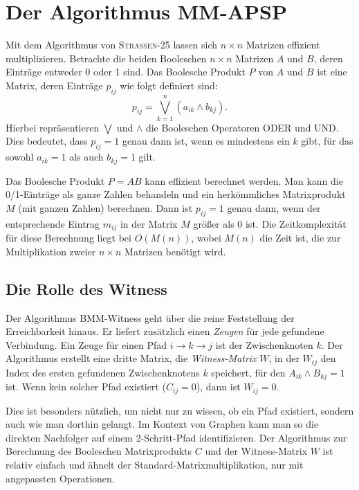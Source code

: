 \documentclass{scrartcl}
\numberwithin{equation}{section}
\begin{document}
\section{Der Algorithmus MM-APSP}
Mit dem Algorithmus von \textsc{Strassen-25} lassen sich $n \times n$ Matrizen effizient multiplizieren. Betrachte die beiden Booleschen $n \times n$ Matrizen $A$ und $B$, deren Einträge entweder 0 oder 1 sind. Das Boolesche Produkt $P$ von $A$ und $B$ ist eine Matrix, deren Einträge $p_{ij}$ wie folgt definiert sind:
$$p_{ij}=\bigvee_{k=1}^{n}(a_{ik}\wedge b_{kj}).$$
Hierbei repräsentieren $\bigvee$ und $\wedge$ die Booleschen Operatoren ODER und UND. Dies bedeutet, dass $p_{ij}=1$ genau dann ist, wenn es mindestens ein $k$ gibt, für das sowohl $a_{ik}=1$ als auch $b_{kj}=1$ gilt.

Das Boolesche Produkt $P=AB$ kann effizient berechnet werden. Man kann die 0/1-Einträge als ganze Zahlen behandeln und ein herkömmliches Matrixprodukt $M$ (mit ganzen Zahlen) berechnen. Dann ist $p_{ij}=1$ genau dann, wenn der entsprechende Eintrag $m_{ij}$ in der Matrix $M$ größer als 0 ist. Die Zeitkomplexität für diese Berechnung liegt bei $O(M(n))$, wobei $M(n)$ die Zeit ist, die zur Multiplikation zweier $n \times n$ Matrizen benötigt wird.

\subsection{Die Rolle des Witness}
Der Algorithmus BMM-Witness geht über die reine Feststellung der Erreichbarkeit hinaus. Er liefert zusätzlich einen \textit{Zeugen} für jede gefundene Verbindung. Ein Zeuge für einen Pfad $i \to k \to j$ ist der Zwischenknoten $k$. Der Algorithmus erstellt eine dritte Matrix, die \textit{Witness-Matrix} $W$, in der $W_{ij}$ den Index des ersten gefundenen Zwischenknotens $k$ speichert, für den $A_{ik} \land B_{kj} = 1$ ist. Wenn kein solcher Pfad existiert ($C_{ij} = 0$), dann ist $W_{ij} = 0$.

Dies ist besonders nützlich, um nicht nur zu wissen, ob ein Pfad existiert, sondern auch wie man dorthin gelangt. Im Kontext von Graphen kann man so die direkten Nachfolger auf einem 2-Schritt-Pfad identifizieren. Der Algorithmus zur Berechnung des Booleschen Matrixprodukts $C$ und der Witness-Matrix $W$ ist relativ einfach und ähnelt der Standard-Matrixmultiplikation, nur mit angepassten Operationen.
\end{document}
